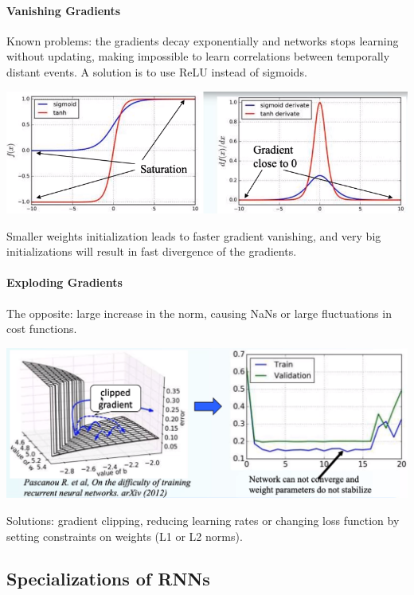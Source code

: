 \documentclass[10pt]{report}
\begin{document}
\paragraph{Vanishing Gradients} Known problems: the gradients decay exponentially and networks stops learning without updating, making impossible to learn correlations between temporally distant events. A solution is to use ReLU instead of sigmoids.
\begin{center}
	\includegraphics[scale=0.5]{28.png}
\end{center}
Smaller weights initialization leads to faster gradient vanishing, and very big initializations will result in fast divergence of the gradients.
\paragraph{Exploding Gradients} The opposite: large increase in the norm, causing NaNs or large fluctuations in cost functions.
\begin{center}
	\includegraphics[scale=0.4]{29.png}
\end{center}
Solutions: gradient clipping, reducing learning rates or changing loss function by setting constraints on weights (L1 or L2 norms).
\subsection{Specializations of RNNs}
\end{document}
